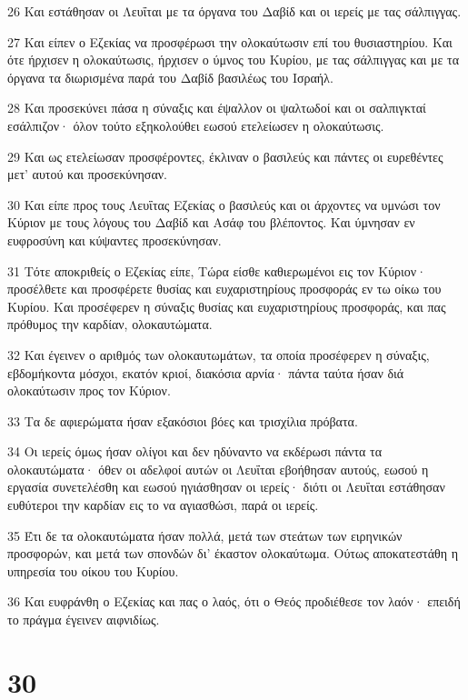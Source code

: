 \par 26 Και εστάθησαν οι Λευΐται με τα όργανα του Δαβίδ και οι ιερείς με τας σάλπιγγας.
\par 27 Και είπεν ο Εζεκίας να προσφέρωσι την ολοκαύτωσιν επί του θυσιαστηρίου. Και ότε ήρχισεν η ολοκαύτωσις, ήρχισεν ο ύμνος του Κυρίου, με τας σάλπιγγας και με τα όργανα τα διωρισμένα παρά του Δαβίδ βασιλέως του Ισραήλ.
\par 28 Και προσεκύνει πάσα η σύναξις και έψαλλον οι ψαλτωδοί και οι σαλπιγκταί εσάλπιζον· όλον τούτο εξηκολούθει εωσού ετελείωσεν η ολοκαύτωσις.
\par 29 Και ως ετελείωσαν προσφέροντες, έκλιναν ο βασιλεύς και πάντες οι ευρεθέντες μετ' αυτού και προσεκύνησαν.
\par 30 Και είπε προς τους Λευΐτας Εζεκίας ο βασιλεύς και οι άρχοντες να υμνώσι τον Κύριον με τους λόγους του Δαβίδ και Ασάφ του βλέποντος. Και ύμνησαν εν ευφροσύνη και κύψαντες προσεκύνησαν.
\par 31 Τότε αποκριθείς ο Εζεκίας είπε, Τώρα είσθε καθιερωμένοι εις τον Κύριον· προσέλθετε και προσφέρετε θυσίας και ευχαριστηρίους προσφοράς εν τω οίκω του Κυρίου. Και προσέφερεν η σύναξις θυσίας και ευχαριστηρίους προσφοράς, και πας πρόθυμος την καρδίαν, ολοκαυτώματα.
\par 32 Και έγεινεν ο αριθμός των ολοκαυτωμάτων, τα οποία προσέφερεν η σύναξις, εβδομήκοντα μόσχοι, εκατόν κριοί, διακόσια αρνία· πάντα ταύτα ήσαν διά ολοκαύτωσιν προς τον Κύριον.
\par 33 Τα δε αφιερώματα ήσαν εξακόσιοι βόες και τρισχίλια πρόβατα.
\par 34 Οι ιερείς όμως ήσαν ολίγοι και δεν ηδύναντο να εκδέρωσι πάντα τα ολοκαυτώματα· όθεν οι αδελφοί αυτών οι Λευΐται εβοήθησαν αυτούς, εωσού η εργασία συνετελέσθη και εωσού ηγιάσθησαν οι ιερείς· διότι οι Λευΐται εστάθησαν ευθύτεροι την καρδίαν εις το να αγιασθώσι, παρά οι ιερείς.
\par 35 Έτι δε τα ολοκαυτώματα ήσαν πολλά, μετά των στεάτων των ειρηνικών προσφορών, και μετά των σπονδών δι' έκαστον ολοκαύτωμα. Ούτως αποκατεστάθη η υπηρεσία του οίκου του Κυρίου.
\par 36 Και ευφράνθη ο Εζεκίας και πας ο λαός, ότι ο Θεός προδιέθεσε τον λαόν· επειδή το πράγμα έγεινεν αιφνιδίως.

\chapter{30}

